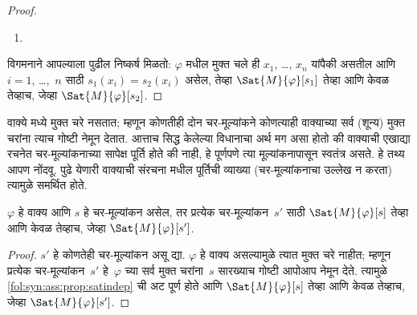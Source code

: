 \begin{proof}
\begin{enumerate}
\item

\end{enumerate}
विगमनाने आपल्याला पुढील निष्कर्ष मिळतो: $\varphi$ मधील मुक्त चले
ही $x_1$, \dots, $x_n$ यांपैकी असतील आणि $i = 1$, \dots,~$n$ साठी
$s_1(x_i)=s_2(x_i)$ असेल, तेव्हा $\Sat{M}{\varphi}[s_1]$ तेव्हा आणि केवळ
तेव्हाच, जेव्हा $\Sat{M}{\varphi}[s_2]$.
\end{proof}



\begin{explain}
वाक्ये मध्ये मुक्त चरे नसतात; म्हणून कोणतीही दोन चर-मूल्यांकने
कोणत्याही वाक्याच्या सर्व (शून्य) मुक्त चरांना त्याच गोष्टी नेमून देतात.
आत्ताच सिद्ध केलेल्या विधानाचा अर्थ मग असा होतो की वाक्याची
एखाद्या रचनेत चर-मूल्यांकनाच्या सापेक्ष पूर्ति होते की नाही, हे पूर्णपणे
त्या मूल्यांकनापासून स्वतंत्र असते. हे तथ्य आपण नोंदवू. पुढे येणारी
वाक्याची संरचना मधील पूर्तिची व्याख्या (चर-मूल्यांकनाचा
उल्लेख न करता) त्यामुळे समर्थित होते.
\end{explain}

\begin{cor}
\label{fol:syn:ass:cor:sat-sentence}
$\varphi$ हे वाक्य आणि $s$ हे चर-मूल्यांकन असेल, तर प्रत्येक
चर-मूल्यांकन~$s'$ साठी $\Sat{M}{\varphi}[s]$ तेव्हा आणि केवळ तेव्हाच,
जेव्हा $\Sat{M}{\varphi}[s']$.
\end{cor}

\begin{proof}
  $s'$ हे कोणतेही चर-मूल्यांकन असू द्या. $\varphi$ हे वाक्य
  असल्यामुळे त्यात मुक्त चरे नाहीत; म्हणून प्रत्येक चर-मूल्यांकन~$s'$
  हे~$\varphi$ च्या सर्व मुक्त चरांना~$s$ सारख्याच गोष्टी आपोआप नेमून देते.
  त्यामुळे \ref{fol:syn:ass:prop:satindep} ची अट पूर्ण होते आणि
  $\Sat{M}{\varphi}[s]$ तेव्हा आणि केवळ तेव्हाच, जेव्हा
  $\Sat{M}{\varphi}[s']$.
\end{proof}

